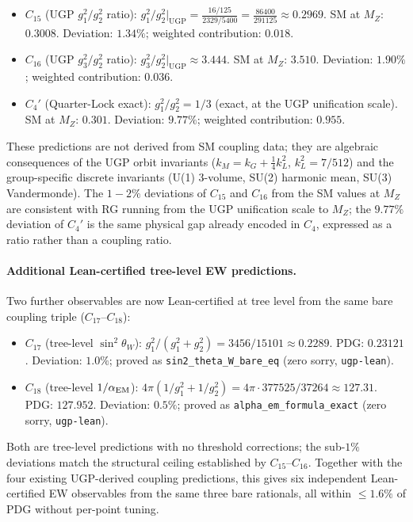 \documentclass[11pt,twocolumn]{article}
\theoremstyle{remark}
\begin{document}
\begin{itemize}
  \item $C_{15}$ (UGP $g_1^2/g_2^2$ ratio): $g_1^2/g_2^2\big|_{\mathrm{UGP}}
    = \frac{16/125}{2329/5400} = \frac{86400}{291125}\approx 0.2969$.
    SM at $M_Z$: $0.3008$. Deviation: $1.34\%$; weighted contribution:
    $0.018$.
  \item $C_{16}$ (UGP $g_3^2/g_2^2$ ratio): $g_3^2/g_2^2\big|_{\mathrm{UGP}}
    \approx 3.444$.
    SM at $M_Z$: $3.510$. Deviation: $1.90\%$; weighted contribution:
    $0.036$.
  \item $C_4'$ (Quarter-Lock exact): $g_1^2/g_2^2 = 1/3$ (exact, at the
    UGP unification scale). SM at $M_Z$: $0.301$. Deviation: $9.77\%$;
    weighted contribution: $0.955$.
\end{itemize}
These predictions are not derived from SM coupling data; they are
algebraic consequences of the UGP orbit invariants
($k_M=k_G+\tfrac{1}{4}k_L^2$, $k_L^2=7/512$) and the group-specific
discrete invariants (U(1) 3-volume, SU(2) harmonic mean, SU(3)
Vandermonde).
The $1{-}2\%$ deviations of $C_{15}$ and $C_{16}$ from the SM values at
$M_Z$ are consistent with RG running from the UGP unification scale to
$M_Z$; the $9.77\%$ deviation of $C_4'$ is the same physical gap already
encoded in $C_4$, expressed as a ratio rather than a coupling ratio.

\paragraph{Additional Lean-certified tree-level EW predictions.}
Two further observables are now Lean-certified at tree level from the same bare coupling triple ($C_{17}$--$C_{18}$):
\begin{itemize}
  \item $C_{17}$ (tree-level $\sin^2\!\theta_W$): $g_1^2/(g_1^2+g_2^2) = 3456/15101 \approx 0.2289$.
    PDG: $0.23121$. Deviation: $1.0\%$; proved as \texttt{sin2\_theta\_W\_bare\_eq} (zero sorry, \texttt{ugp-lean}).
  \item $C_{18}$ (tree-level $1/\alpha_{\rm EM}$): $4\pi(1/g_1^2 + 1/g_2^2) = 4\pi \cdot 377525/37264 \approx 127.31$.
    PDG: $127.952$. Deviation: $0.5\%$; proved as \texttt{alpha\_em\_formula\_exact} (zero sorry, \texttt{ugp-lean}).
\end{itemize}
Both are tree-level predictions with no threshold corrections; the sub-$1\%$ deviations match the structural ceiling established by $C_{15}$--$C_{16}$.  Together with the four existing UGP-derived coupling predictions, this gives six independent Lean-certified EW observables from the same three bare rationals, all within $\le 1.6\%$ of PDG without per-point tuning.
\end{document}
